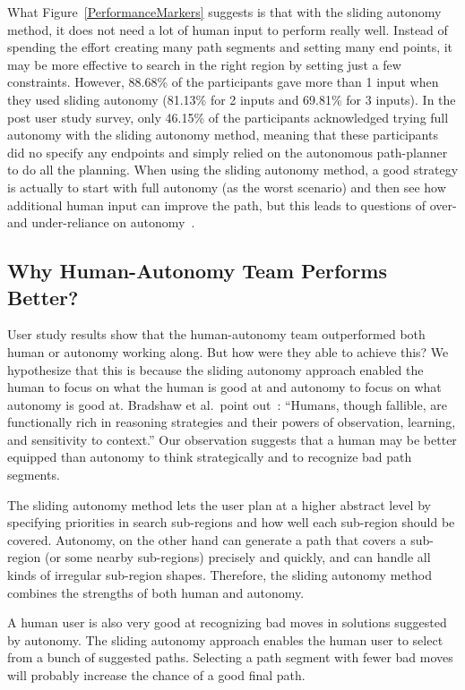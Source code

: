 \documentclass[lettersize, apacite, twoside, HRI]{apa_HRI}
\begin{document}
What Figure~\ref{PerformanceMarkers} suggests is that with the sliding autonomy method, it does not need a lot of human input to perform really well. Instead of spending the effort creating many path segments and setting many end points, it may be more effective to search in the right region by setting just a few constraints. However, 88.68\% of the participants gave more than 1 input when they used sliding autonomy (81.13\% for 2 inputs and 69.81\% for 3 inputs). In the post user study survey, only 46.15\% of the participants acknowledged trying full autonomy with the sliding autonomy method, meaning that these participants did no specify any endpoints and simply relied on the autonomous path-planner to do all the planning. When using the sliding autonomy method, a good strategy is actually to start with full autonomy (as the worst scenario) and then see how additional human input can improve the path, but this leads to questions of over- and under-reliance on autonomy~\cite{Bradshaw2013Seven}.

\subsection{Why Human-Autonomy Team Performs Better?}

User study results show that the human-autonomy team outperformed both human or autonomy working along. But how were they able to achieve this? We hypothesize that this is because the sliding autonomy approach enabled the human to focus on what the human is good at and autonomy to focus on what autonomy is good at. Bradshaw et al.\ point out~\cite{Bradshaw2013Seven}: ``Humans, though fallible, are functionally rich in reasoning strategies and their powers of observation, learning, and sensitivity to context.'' Our observation suggests that a human may be better equipped than autonomy to think strategically and to recognize bad path segments.

The sliding autonomy method lets the user plan at a higher abstract level by specifying priorities in search sub-regions and how well each sub-region should be covered. Autonomy, on the other hand can generate a path that covers a sub-region (or some nearby sub-regions) precisely and quickly, and can handle all kinds of irregular sub-region shapes. Therefore, the sliding autonomy method combines the strengths of both human and autonomy.

A human user is also very good at recognizing bad moves in solutions suggested by autonomy. The sliding autonomy approach enables the human user to select from a bunch of suggested paths. Selecting a path segment with fewer bad moves will probably increase the chance of a good final path.
\end{document}
